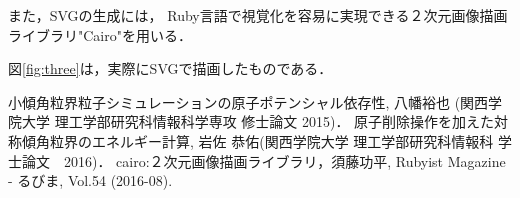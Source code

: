 \documentclass[a4j,twocolumn]{jsarticle}
\begin{document}
また，SVGの生成には，
Ruby言語で視覚化を容易に実現できる２次元画像描画ライブラリ"Cairo"を用いる\cite{sudoh}．

図\ref{fig:three}は，実際にSVGで描画したものである．



\begin{thebibliography}{9}
 小傾角粒界粒子シミュレーションの原子ポテンシャル依存性, 八幡裕也 (関西学院大学 理工学部研究科情報科学専攻 修士論文 2015)．
 原子削除操作を加えた対称傾角粒界のエネルギー計算, 岩佐 恭佑(関西学院大学 理工学部研究科情報科 学士論文　2016)． 
 cairo:２次元画像描画ライブラリ，須藤功平, Rubyist Magazine - るびま, Vol.54 (2016-08).
\end{thebibliography}
\end{document}
